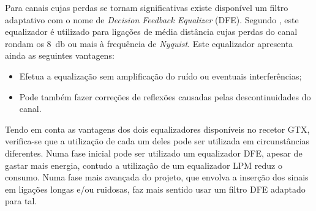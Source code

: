 Para canais cujas perdas se tornam significativas existe disponível um filtro adaptativo com o nome de \textit{Decision Feedback Equalizer} (DFE). 
Segundo \cite{R011}, este equalizador é utilizado para ligações de média distância cujas perdas do canal rondam os \SI{8}{\decibel} ou mais à frequência de \textit{Nyquist}. Este equalizador apresenta ainda as seguintes vantagens:
\begin{itemize}
	\item Efetua a equalização sem amplificação do ruído ou eventuais interferências;
	\item Pode também fazer correções de reflexões causadas pelas descontinuidades do canal.
\end{itemize}


Tendo em conta as vantagens dos dois equalizadores disponíveis no recetor GTX, verifica-se que a utilização de cada um deles pode ser utilizada em circunstâncias diferentes. Numa fase inicial pode ser utilizado um equalizador DFE, apesar de gastar mais energia, contudo a utilização de um equalizador LPM reduz o consumo. Numa fase mais avançada do projeto, que envolva a inserção dos sinais em ligações longas e/ou ruidosas, faz mais sentido usar um filtro DFE adaptado para tal. 



%

